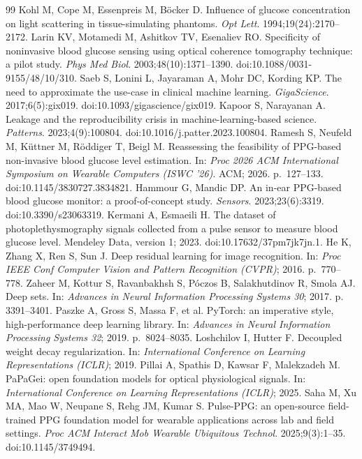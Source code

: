 \documentclass[11pt]{article}
\begin{document}
\begin{thebibliography}{99}
 Kohl M, Cope M, Essenpreis M, B\"ocker D. Influence of glucose concentration on light scattering in tissue-simulating phantoms. \emph{Opt Lett}. 1994;19(24):2170--2172.
 Larin KV, Motamedi M, Ashitkov TV, Esenaliev RO. Specificity of noninvasive blood glucose sensing using optical coherence tomography technique: a pilot study. \emph{Phys Med Biol}. 2003;48(10):1371--1390. doi:10.1088/0031-9155/48/10/310.
 Saeb S, Lonini L, Jayaraman A, Mohr DC, Kording KP. The need to approximate the use-case in clinical machine learning. \emph{GigaScience}. 2017;6(5):gix019. doi:10.1093/gigascience/gix019.
 Kapoor S, Narayanan A. Leakage and the reproducibility crisis in machine-learning-based science. \emph{Patterns}. 2023;4(9):100804. doi:10.1016/j.patter.2023.100804.
 Ramesh S, Neufeld M, K\"uttner M, R\"oddiger T, Beigl M. Reassessing the feasibility of PPG-based non-invasive blood glucose level estimation. In: \emph{Proc 2026 ACM International Symposium on Wearable Computers (ISWC '26)}. ACM; 2026. p.~127--133. doi:10.1145/3830727.3834821.
 Hammour G, Mandic DP. An in-ear PPG-based blood glucose monitor: a proof-of-concept study. \emph{Sensors}. 2023;23(6):3319. doi:10.3390/s23063319.
 Kermani A, Esmaeili H. The dataset of photoplethysmography signals collected from a pulse sensor to measure blood glucose level. Mendeley Data, version 1; 2023. doi:10.17632/37pm7jk7jn.1.
 He K, Zhang X, Ren S, Sun J. Deep residual learning for image recognition. In: \emph{Proc IEEE Conf Computer Vision and Pattern Recognition (CVPR)}; 2016. p.~770--778.
 Zaheer M, Kottur S, Ravanbakhsh S, P\'oczos B, Salakhutdinov R, Smola AJ. Deep sets. In: \emph{Advances in Neural Information Processing Systems 30}; 2017. p. 3391--3401.
 Paszke A, Gross S, Massa F, et al. PyTorch: an imperative style, high-performance deep learning library. In: \emph{Advances in Neural Information Processing Systems 32}; 2019. p.~8024--8035.
 Loshchilov I, Hutter F. Decoupled weight decay regularization. In: \emph{International Conference on Learning Representations (ICLR)}; 2019.
 Pillai A, Spathis D, Kawsar F, Malekzadeh M. PaPaGei: open foundation models for optical physiological signals. In: \emph{International Conference on Learning Representations (ICLR)}; 2025.
 Saha M, Xu MA, Mao W, Neupane S, Rehg JM, Kumar S. Pulse-PPG: an open-source field-trained PPG foundation model for wearable applications across lab and field settings. \emph{Proc ACM Interact Mob Wearable Ubiquitous Technol}. 2025;9(3):1--35. doi:10.1145/3749494.

\end{thebibliography}
\end{document}
